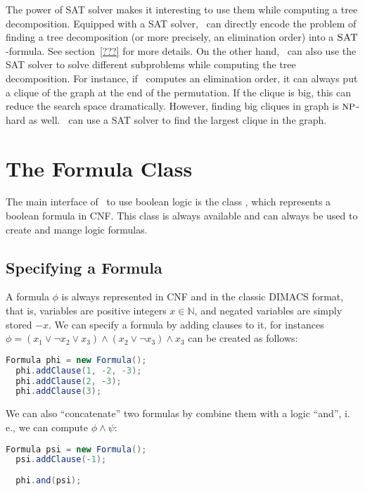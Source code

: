 \documentclass[a4paper, ukenglish, twoside, openright]{jdrasilmanual}
\begin{document}
The power of SAT solver makes it interesting to use them while
computing a tree decomposition. Equipped with a SAT solver, \Jdrasil\
can directly encode the problem of finding a tree decomposition (or
more precisely, an elimination order) into a $\Lang{SAT}$-formula. See
section~\ref{???} for more details. On the other hand, \Jdrasil\ can
also use the SAT solver to solve different subproblems while computing
the tree decomposition. For instance, if \Jdrasil\ computes an
elimination order, it can always put a clique of the graph at the
end of the permutation. If the clique is big, this can reduce the
search space dramatically. However, finding big cliques in graph is
$\Class{NP}$-hard as well. \Jdrasil\ can use a SAT solver to find the
largest clique in the graph.

\section{The Formula Class}\label{section:satFormula}
The main interface of \Jdrasil\ to use boolean logic is the class
\JClass{jdrasil.sat.Formula}, which represents a boolean formula in
CNF. This class is always available and can always be used to create
and mange logic formulas. 

\subsection{Specifying a Formula}
A formula $\phi$ is always represented in CNF and in the classic
DIMACS format, that is, variables are positive integers
$x\in\mathbb{N}$, and negated variables are simply stored $-x$. We
can specify a formula by adding clauses to it, for instances
$\phi=(x_1\vee\neg x_2\vee x_3)\wedge(x_2\vee\neg x_3)\wedge x_3$ can
be created as follows:

\begin{lstlisting}[language=Java]
  Formula phi = new Formula();
  phi.addClause(1, -2, -3);
  phi.addClause(2, -3);
  phi.addClause(3);
\end{lstlisting}

We can also ``concatenate'' two formulas by combine them with a logic
``and'', i.\,e., we can compute $\phi\wedge\psi$:

\begin{lstlisting}[language=Java]
  Formula psi = new Formula();
  psi.addClause(-1);
  
  phi.and(psi);
\end{lstlisting}
\end{document}
